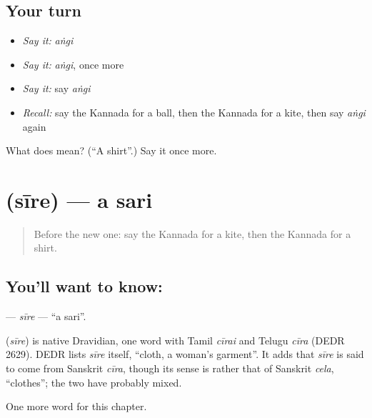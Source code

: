 \subsection*{Your turn}
\begin{itemize}
\raggedright
  \item \emph{Say it:} \emph{aṅgi}
  \item \emph{Say it:} \emph{aṅgi}, once more
  \item \emph{Say it:} say \emph{aṅgi}
  \item \emph{Recall:} say the Kannada for a ball, then the Kannada for a kite, then say \emph{aṅgi} again
\end{itemize}

\begin{tcolorbox}[breakable,colback=teal!4,colframe=teal!35!black,title={Before you move on}]
What does  mean? (\textquotedblleft{}A shirt\textquotedblright{}.) Say it once more.
\end{tcolorbox}
\section[\texorpdfstring{\kn{ಸೀರೆ} (sīre)}{ಸೀರೆ (sīre)}]{ (sīre) — a sari}

\label{lesson:KA-C120-sire}



\begin{quote}
Before the new one: say the Kannada for a kite, then the Kannada for a shirt.
\end{quote}

\subsection*{You'll want to know: }
\textbf{} — \emph{sīre} — \textquotedblleft{}a sari\textquotedblright{}.

\begin{cousinweb}
\textbf{} (\emph{sīre}) is native Dravidian, one word with Tamil \emph{cīrai} and Telugu \emph{cīra} (DEDR 2629). DEDR lists \emph{sīre} itself, \textquotedblleft{}cloth, a woman's garment\textquotedblright{}. It adds that \emph{sīre} is said to come from Sanskrit \emph{cīra}, though its sense is rather that of Sanskrit \emph{cela}, \textquotedblleft{}clothes\textquotedblright{}; the two have probably mixed.
\end{cousinweb}

\begin{grammarlens}[title={What you've built}]
One more word for this chapter.
\end{grammarlens}

